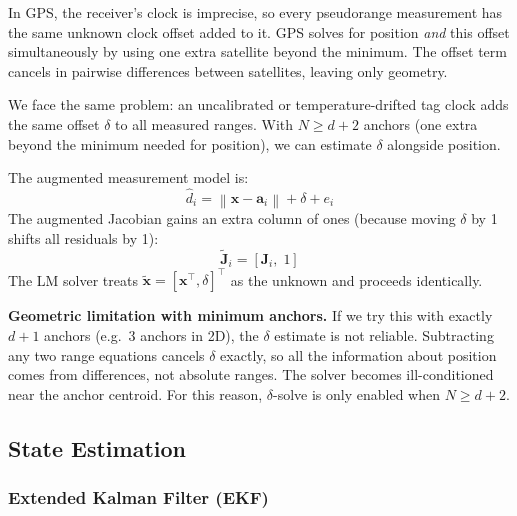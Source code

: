\documentclass[11pt,a4paper]{article}
\newcommand{\vect}[1]{\bm{#1}}
\newcommand{\mat}[1]{\mathbf{#1}}
\newcommand{\norm}[1]{\left\|#1\right\|}
\newcommand{\Trans}{^{\top}}
\begin{document}
\begin{intubox}
In GPS, the receiver's clock is imprecise, so every pseudorange measurement has the same unknown clock offset added to it. GPS solves for position \emph{and} this offset simultaneously by using one extra satellite beyond the minimum. The offset term cancels in pairwise differences between satellites, leaving only geometry.

We face the same problem: an uncalibrated or temperature-drifted tag clock adds the same offset $\delta$ to all measured ranges. With $N \geq d+2$ anchors (one extra beyond the minimum needed for position), we can estimate $\delta$ alongside position.
\end{intubox}

The augmented measurement model is:
\begin{equation}
\hat{d}_i = \norm{\vect{x} - \vect{a}_i} + \delta + e_i
\end{equation}
The augmented Jacobian gains an extra column of ones (because moving $\delta$ by 1 shifts all residuals by 1):
\begin{equation}
\tilde{\mat{J}}_i = \left[\mat{J}_i,\; 1\right]
\label{eq:jacaug}
\end{equation}
The LM solver treats $\tilde{\vect{x}} = [\vect{x}\Trans, \delta]\Trans$ as the unknown and proceeds identically.

\begin{notebox}
\textbf{Geometric limitation with minimum anchors.} If we try this with exactly $d+1$ anchors (e.g.\ 3 anchors in 2D), the $\delta$ estimate is not reliable. Subtracting any two range equations cancels $\delta$ exactly, so all the information about position comes from differences, not absolute ranges. The solver becomes ill-conditioned near the anchor centroid. For this reason, $\delta$-solve is only enabled when $N \geq d+2$.
\end{notebox}

\subsection{State Estimation}

\subsubsection{Extended Kalman Filter (EKF)}
\end{document}

